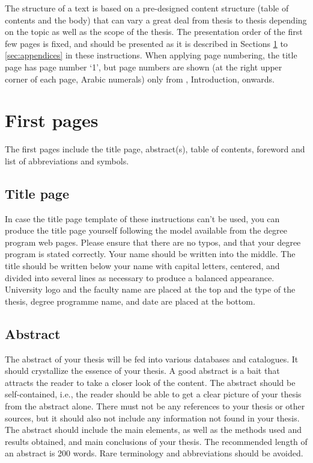 
The structure of a text is based on a pre-designed content structure (table of contents and the body) that can vary a great deal from thesis to thesis depending on the topic as well as the scope of the thesis. The presentation order of the first few pages is fixed, and should be presented as it is described in Sections \ref{sec:first_pages} to \ref{sec:appendices} in these instructions. When applying page numbering, the title page has page number ‘1’, but page numbers are shown (at the right upper corner of each page, Arabic numerals) only from , Introduction, onwards.

\section{First pages}
\label{sec:first_pages}
The first pages include the title page, abstract(s), table of contents, foreword and list of abbreviations and symbols. 

\subsection{Title page}

In case the title page template of these instructions can't be used, you can produce the title page yourself following the model available from the degree program web pages. Please ensure that there are no typos, and that your degree program is stated correctly. Your name should be written into the middle. The title should be written below your name with capital letters, centered, and divided into several lines as necessary to produce a balanced appearance. University logo and the faculty name are placed at the top and the type of the thesis, degree programme name, and date are placed at the bottom.

\subsection{Abstract}

The abstract of your thesis will be fed into various databases and catalogues. It should crystallize the essence of your thesis. A good abstract is a bait that attracts the reader to take a closer look of the content. The abstract should be self-contained, i.e., the reader should be able to get a clear picture of your thesis from the abstract alone. There must not be any references to your thesis or other sources, but it should also not include any information not found in your thesis. The abstract should include the main elements, as well as the methods used and results obtained, and main conclusions of your thesis. The recommended length of an abstract is 200 words. Rare terminology and abbreviations should be avoided. 

